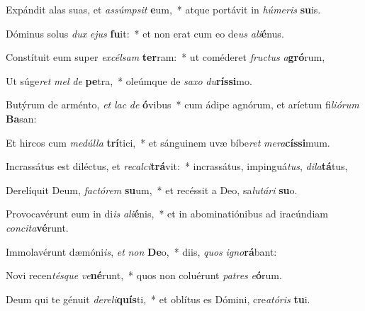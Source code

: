 \item Expándit alas suas, et \textit{as}\textit{súmp}\textit{sit} \textbf{e}um,~* atque portávit in \textit{hú}\textit{me}\textit{ris} \textbf{su}is.
\item Dóminus solus \textit{dux} \textit{e}\textit{jus} \textbf{fu}it:~* et non erat cum eo de\textit{us} \textit{a}\textit{li}\textbf{é}nus.
\item Constítuit eum super \textit{ex}\textit{cél}\textit{sam} \textbf{ter}ram:~* ut coméderet \textit{fruc}\textit{tus} \textit{a}\textbf{gró}rum,
\item Ut súge\textit{ret} \textit{mel} \textit{de} \textbf{pe}tra,~* oleúmque de \textit{sa}\textit{xo} \textit{du}\textbf{rís}\textbf{si}mo.
\item Butýrum de arménto, \textit{et} \textit{lac} \textit{de} \textbf{ó}vibus~* cum ádipe agnórum, et aríetum fi\textit{li}\textit{ó}\textit{rum} \textbf{Ba}san:
\item Et hircos cum \textit{me}\textit{dúl}\textit{la} \textbf{trí}tici,~* et sánguinem uvæ bíbe\textit{ret} \textit{me}\textit{ra}\textbf{cís}\textbf{si}mum.
\item Incrassátus est diléctus, et \textit{re}\textit{cal}\textit{ci}\textbf{trá}vit:~* incrassátus, impinguá\textit{tus}, \textit{di}\textit{la}\textbf{tá}tus,
\item Derelíquit Deum, \textit{fac}\textit{tó}\textit{rem} \textbf{su}um,~* et recéssit a Deo, sa\textit{lu}\textit{tá}\textit{ri} \textbf{su}o.
\item Provocavérunt eum in di\textit{is} \textit{a}\textit{li}\textbf{é}nis,~* et in abominatiónibus ad iracúndiam \textit{con}\textit{ci}\textit{ta}\textbf{vé}runt.
\item Immolavérunt dæmóni\textit{is}, \textit{et} \textit{non} \textbf{De}o,~* diis, \textit{quos} \textit{i}\textit{gno}\textbf{rá}bant:
\item Novi recen\textit{tés}\textit{que} \textit{ve}\textbf{né}runt,~* quos non coluérunt \textit{pa}\textit{tres} \textit{e}\textbf{ó}rum.
\item Deum qui te génuit \textit{de}\textit{re}\textit{li}\textbf{quís}ti,~* et oblítus es Dómini, cre\textit{a}\textit{tó}\textit{ris} \textbf{tu}i.
